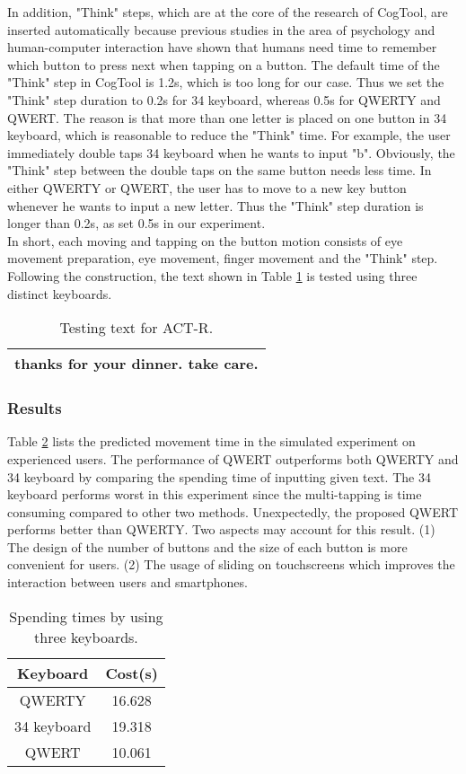 \documentclass{singlecol-new}
\theoremstyle{TH}{
\newtheorem{lemma}{Lemma}
\newtheorem{theorem}[lemma]{Theorem}
\newtheorem{corrolary}[lemma]{Corrolary}
\newtheorem{conjecture}[lemma]{Conjecture}
\newtheorem{proposition}[lemma]{Proposition}
\newtheorem{claim}[lemma]{Claim}
\newtheorem{stheorem}[lemma]{Wrong Theorem}
\newtheorem{algorithm}{Algorithm}
}
\theoremstyle{THrm}{
\newtheorem{definition}{Definition}[section]
\newtheorem{question}{Question}[section]
\newtheorem{remark}{Remark}
\newtheorem{scheme}{Scheme}
}
\theoremstyle{THhit}{
\newtheorem{case}{Case}[section]
}
\begin{document}
In addition, "Think" steps, which are at the core of the research of CogTool, are inserted automatically because previous studies in the area of psychology and human-computer interaction have shown that humans need time to remember which button to press next when tapping on a button. The default time of the "Think" step in CogTool is 1.2s, which is too long for our case. Thus we set the "Think" step duration to 0.2s for 34 keyboard, whereas 0.5s for QWERTY and QWERT. The reason is that more than one letter is placed on one button in 34 keyboard, which is reasonable to reduce the "Think" time. For example, the user immediately double taps 34 keyboard when he wants to input "b". Obviously, the "Think" step between the double taps on the same button needs less time. In either QWERTY or QWERT, the user has to move to a new key button whenever he wants to input a new letter. Thus the "Think" step duration is longer than 0.2s, as set 0.5s in our experiment. \\

In short, each moving and tapping on the button motion consists of eye movement preparation, eye movement, finger movement and the "Think" step. Following the construction, the text shown in Table \ref{tab.box} is tested using three distinct keyboards. \\
\begin{table}
\centering
\caption{Testing text for ACT-R.}\label{tab.box}
\begin{tabular}{|c|}
  \hline
thanks for your dinner. take care. \\
  \hline
\end{tabular}
\end{table}

\subsubsection{Results}

Table \ref{tab.res} lists the predicted movement time in the simulated experiment on experienced users. The performance of QWERT outperforms both QWERTY and 34 keyboard by comparing the spending time of inputting given text. The 34 keyboard performs worst in this experiment since the multi-tapping is time consuming compared to other two methods. Unexpectedly, the proposed QWERT performs better than QWERTY. Two aspects may account for this result. (1) The design of the number of buttons and the size of each button is more convenient for users. (2) The usage of sliding on touchscreens which improves the interaction between users and smartphones. \\
\begin{table}
\centering
\caption{Spending times by using three keyboards.}\label{tab.res}
\begin{tabular}{cc}
  \hline
Keyboard & Cost(s) \\
  \hline
  QWERTY & 16.628 \\
  34 keyboard & 19.318 \\
  QWERT & 10.061 \\
  \hline
\end{tabular}
\end{table}
\end{document}
